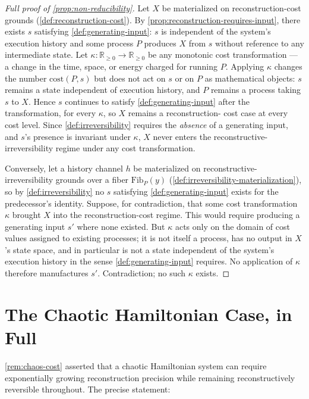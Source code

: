 \documentclass[11pt]{book}
\theoremstyle{plain}
\theoremstyle{definition}
\theoremstyle{remark}
\begin{document}
\begin{proof}[Full proof of \cref{prop:non-reducibility}]
Let $X$ be materialized on reconstruction-cost grounds
(\cref{def:reconstruction-cost}). By \cref{prop:reconstruction-requires-input},
there exists $s$ satisfying \cref{def:generating-input}: $s$ is
independent of the system's execution history and some process $P$
produces $X$ from $s$ without reference to any intermediate state.
Let $\kappa : \mathbb{R}_{\geq 0} \to \mathbb{R}_{\geq 0}$ be any
monotonic cost transformation --- a change in the time, space, or
energy charged for running $P$. Applying $\kappa$ changes the number
$\mathrm{cost}(P, s)$ but does not act on $s$ or on $P$ as
mathematical objects: $s$ remains a state independent of execution
history, and $P$ remains a process taking $s$ to $X$. Hence $s$
continues to satisfy \cref{def:generating-input} after the
transformation, for every $\kappa$, so $X$ remains a reconstruction-
cost case at every cost level. Since \cref{def:irreversibility}
requires the \emph{absence} of a generating input, and $s$'s presence
is invariant under $\kappa$, $X$ never enters the reconstructive-
irreversibility regime under any cost transformation.

Conversely, let a history channel $h$ be materialized on
reconstructive-irreversibility grounds over a fiber
$\mathrm{Fib}_P(y)$ (\cref{def:irreversibility-materialization}), so
by \cref{def:irreversibility} no $s$ satisfying
\cref{def:generating-input} exists for the predecessor's identity.
Suppose, for contradiction, that some cost transformation $\kappa$
brought $X$ into the reconstruction-cost regime. This would require
producing a generating input $s'$ where none existed. But $\kappa$
acts only on the domain of cost values assigned to existing processes;
it is not itself a process, has no output in $X$'s state space, and in
particular is not a state independent of the system's execution
history in the sense \cref{def:generating-input} requires. No
application of $\kappa$ therefore manufactures $s'$. Contradiction; no
such $\kappa$ exists.
\end{proof}

\section{The Chaotic Hamiltonian Case, in Full}

\cref{rem:chaos-cost} asserted that a chaotic Hamiltonian system can
require exponentially growing reconstruction precision while remaining
reconstructively reversible throughout. The precise statement:
\end{document}
